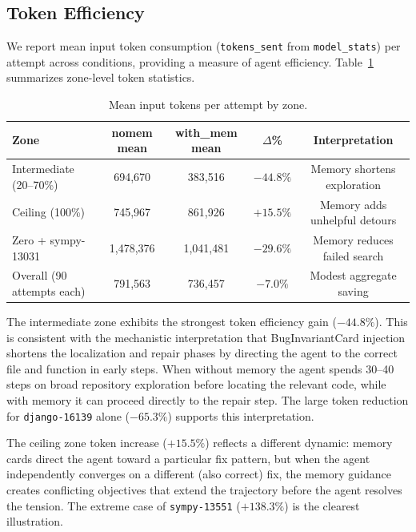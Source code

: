 \documentclass{article}
\begin{document}
\subsection{Token Efficiency}
\label{sec:tokens}

We report mean input token consumption (\texttt{tokens\_sent} from \texttt{model\_stats}) per attempt across conditions, providing a measure of agent efficiency. Table~\ref{tab:tokens} summarizes zone-level token statistics.

\begin{table}[h]
\centering
\caption{Mean input tokens per attempt by zone.}
\label{tab:tokens}
\begin{tabular}{lcccc}
\toprule
\textbf{Zone} & \textbf{nomem mean} & \textbf{with\_mem mean} & \textbf{$\Delta$\%} & \textbf{Interpretation} \\
\midrule
Intermediate (20--70\%) & 694,670 & 383,516 & $-44.8\%$ & Memory shortens exploration \\
Ceiling (100\%) & 745,967 & 861,926 & $+15.5\%$ & Memory adds unhelpful detours \\
Zero + sympy-13031 & 1,478,376 & 1,041,481 & $-29.6\%$ & Memory reduces failed search \\
\midrule
Overall (90 attempts each) & 791,563 & 736,457 & $-7.0\%$ & Modest aggregate saving \\
\bottomrule
\end{tabular}
\end{table}

The intermediate zone exhibits the strongest token efficiency gain ($-44.8\%$). This is consistent with the mechanistic interpretation that BugInvariantCard injection shortens the localization and repair phases by directing the agent to the correct file and function in early steps. When without memory the agent spends 30--40 steps on broad repository exploration before locating the relevant code, while with memory it can proceed directly to the repair step. The large token reduction for \texttt{django-16139} alone ($-65.3\%$) supports this interpretation.

The ceiling zone token increase ($+15.5\%$) reflects a different dynamic: memory cards direct the agent toward a particular fix pattern, but when the agent independently converges on a different (also correct) fix, the memory guidance creates conflicting objectives that extend the trajectory before the agent resolves the tension. The extreme case of \texttt{sympy-13551} ($+138.3\%$) is the clearest illustration.
\end{document}
